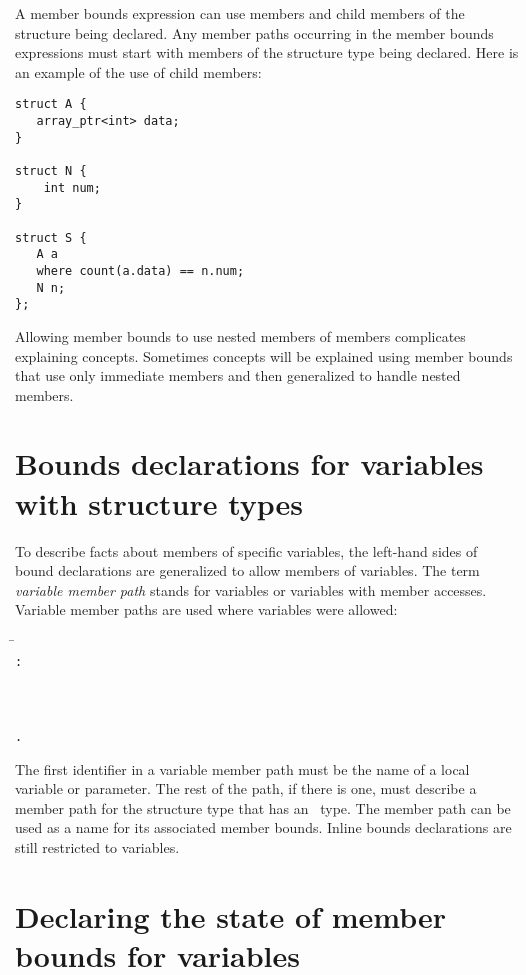 A member bounds expression can use members and child members of the
structure being declared. Any member paths occurring in the member
bounds expressions must start with members of the structure type being
declared. Here is an example of the use of child members:

\begin{verbatim}
struct A {
   array_ptr<int> data;
}

struct N {
    int num;
}

struct S {
   A a
   where count(a.data) == n.num;
   N n;
};
\end{verbatim}

Allowing member bounds to use nested members of members complicates
explaining concepts. Sometimes concepts will be explained using member
bounds that use only immediate members and then generalized to handle
nested members.

\section{Bounds declarations for variables with structure types}

To describe facts about members of specific variables, the left-hand
sides of bound declarations are generalized to allow members of
variables. The term \emph{variable member path} stands for variables or
variables with member accesses. Variable member paths are used where
variables were allowed:
\begin{tabbing}
\=\\
\>  \texttt{:}  \\
\\
 \\
\>  \\
\>  \texttt{.} 
\end{tabbing}

The first identifier in a variable member path must be the name of a
local variable or parameter. The rest of the path, if there is one, must
describe a member path for the structure type that has an
\arrayptr\ type. The member path can be used as a name for its
associated member bounds. Inline bounds declarations are still
restricted to variables.

\section{Declaring the state of member bounds for variables}

